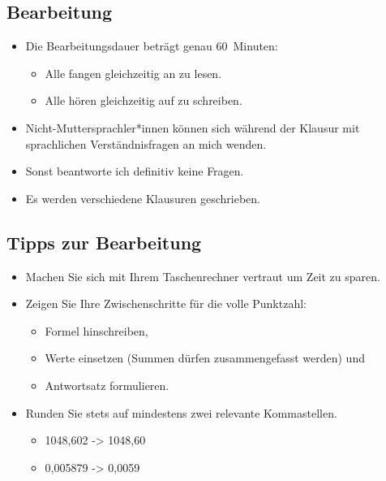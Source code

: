 \documentclass[
  11pt,
  ngerman,
  a4paper,
]{report}
\providecommand{\tightlist}{%
  \setlength{\itemsep}{0pt}\setlength{\parskip}{0pt}}
\begin{document}
\hypertarget{bearbeitung}{%
\subsection*{Bearbeitung}\label{bearbeitung}}

\begin{itemize}
\tightlist
\item
  Die Bearbeitungsdauer beträgt genau 60~Minuten:

  \begin{itemize}
  \tightlist
  \item
    Alle fangen gleichzeitig an zu lesen.
  \item
    Alle hören gleichzeitig auf zu schreiben.
  \end{itemize}
\item
  Nicht-Muttersprachler*innen können sich während der Klausur mit sprachlichen Verständnisfragen an mich wenden.
\item
  Sonst beantworte ich definitiv keine Fragen.
\item
  Es werden verschiedene Klausuren geschrieben.
\end{itemize}

\hypertarget{tipps-zur-bearbeitung}{%
\subsection*{Tipps zur Bearbeitung}\label{tipps-zur-bearbeitung}}

\begin{itemize}
\tightlist
\item
  Machen Sie sich mit Ihrem Taschenrechner vertraut um Zeit zu sparen.
\item
  Zeigen Sie Ihre Zwischenschritte für die volle Punktzahl:

  \begin{itemize}
  \tightlist
  \item
    Formel hinschreiben,
  \item
    Werte einsetzen (Summen dürfen zusammengefasst werden) und
  \item
    Antwortsatz formulieren.
  \end{itemize}
\item
  Runden Sie stets auf mindestens zwei relevante Kommastellen.

  \begin{itemize}
  \tightlist
  \item
    1048,602 -\textgreater{} 1048,60
  \item
    0,005879 -\textgreater{} 0,0059
  \end{itemize}
\end{itemize}
\end{document}
